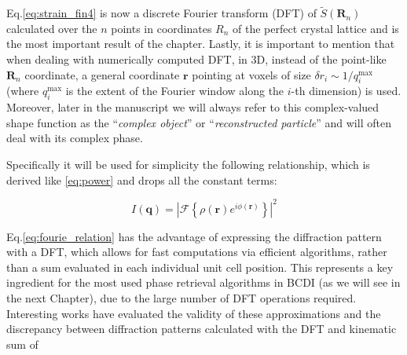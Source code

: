 
Eq.\ref{eq:strain_fin4} is now a discrete Fourier transform (DFT) of $\tilde{S}(\mathbf{R}_n)$ calculated over the $n$ 
points in coordinates $R_n$ of the perfect crystal lattice and is the most important result of the chapter. 
Lastly, it is important to mention that when dealing with numerically computed DFT, in 3D, instead of the point-like 
$\mathbf{R}_n$ coordinate, a general coordinate $\mathbf{r}$ pointing at voxels of size $\delta r_i \sim 1/q^\text{max}_i$ 
(where $q^\text{max}_i$ is the extent of the Fourier window along the $i$-th dimension) is used. Moreover, later in the manuscript we will always refer to this complex-valued 
shape function as the ``\textit{complex object}'' or ``\textit{reconstructed particle}'' and will often deal with its 
complex phase. 

Specifically it will be used for simplicity the following relationship, which is derived like \ref{eq:power} and drops all the constant terms: 

\begin{equation}
    I(\mathbf q) =  \left| \mathcal{F}\!\left\{ \rho(\mathbf{r}) e^{i \phi(\mathbf{r})} \right\} \right |^2
    \label{eq:fourie_relation}
\end{equation}

Eq.\ref{eq:fourie_relation} has the advantage of expressing the diffraction pattern with a DFT, which allows for 
fast computations via efficient algorithms, rather than a sum evaluated in each individual unit cell position. This 
represents a key ingredient for the most used phase retrieval algorithms in BCDI (as we will see in the next Chapter), 
due to the large number of DFT operations required. Interesting works have evaluated the validity of these approximations
\cite{Godard2021} and the discrepancy between diffraction patterns calculated with the DFT and kinematic sum \cite{Haag2013, Madsen2021}
of 

